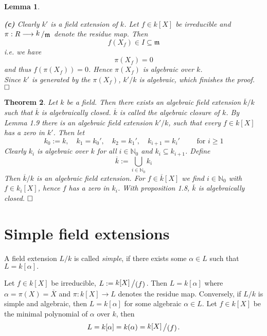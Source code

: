 \documentclass[11pt]{book}
\newtheorem{theorem}{Theorem}[section]
\newtheorem{lemma}[theorem]{Lemma}
\theoremstyle{nonumberbreak}
\newenvironment{defin}[1][]{\ifthenelse{\equal{#1}{}}{\definition}{\definition[#1]}\rm}{\enddefinition}
\newenvironment{pr}[1][]{\ifthenelse{\equal{#1}{}}{\proof}{\proof[#1]}\rm}{\endproof}
\newenvironment{ex}[1][]{\ifthenelse{\equal{#1}{}}{\example}{\example[#1]}\rm}{\endexample}
\newcommand{\slant}[2]{{\raisebox{.1em}{$#1$}\left/\raisebox{-.1em}{$#2$}\right.}}
\begin{document}
\begin{spacing}{1.3}
\begin{lemma}
\begin{pr}
\begin{compactenum}
\item[\textbf{(c)}] Clearly $k'$ is a field extension of $k$.
Let $f \in k[X]$ be irreducible and\\ $\pi: R \longrightarrow \slant{k}{\mathfrak{m}}$ denote the residue map. Then $$f(X_f) \in I \subseteq \mathfrak{m}$$i.e. we have $$\pi(X_f)=0$$ and thus $f\left(\pi(X_f)\right)=0$. Hence $\pi(X_f)$ is algebraic over $k$.\\
Since $k'$ is generated by the $\pi(X_f)$, $k'/k$ is algebraic, which finishes the proof. $\hfill \Box$
\end{compactenum}
\end{pr}
\end{lemma}

\begin{theorem} %
Let $k$ be a field. Then there exists an algebraic field extension $\overline{k}/k$ such that $\overline{k}$ is algebraically closed. $\overline{k}$ is called the \textit{algebraic closure} of $k$.
\begin{pr}
By Lemma 1.9 there is an algebraic field extension $k'/k$, such that every $f \in k[X]$ has a zero in $k'$.
Then let $$k_0:=k, \quad k_1=k_0', \quad k_2=k_1', \quad k_{i+1}=k_i' \qquad \textrm{ for } i \geqslant 1$$
Clearly $k_i$ is algebraic over $k$ for all $i \in \mathbb{N}_0$ and $k_i \subseteq k_{i+1}$.
Define $$\overline{k}:= \bigcup_{i \in \mathbb{N}_0} k_i$$Then $\overline{k}/k$ is an algebraic field extension. For $f \in \overline{k}[X]$ we find $i \in \mathbb{N}_0$ with $f \in k_i[X]$, hence $f$ has a zero in $k_i$. With proposition 1.8, $\overline{k}$ is algebraically closed. $\hfill \Box$
\end{pr}
\end{theorem}


\renewcommand*\thesection{§ \arabic{section}\quad}
\section{Simple field extensions}
\renewcommand*\thesection{\arabic{section}}

\begin{defin}  %
A field extension $L/k$ is called \textit{simple}, if there exists some $\alpha \in L$ such that $L=k[\alpha].$
\end{defin}

\begin{ex} %
Let $f \in k[X]$ be irreducible, $L:=\slant{k[X]}{( f)}$.
Then $L=k[\alpha]$ where $\alpha= \pi(X)=\overline{X}$ and $\pi: k[X] \longrightarrow L$ denotes the residue map.
Conversely, if $L/k$ is simple and algebraic, then $L=k[\alpha]$ for some algebraic $\alpha \in L$. Let $f \in  k[X]$ be the minimal polynomial of $\alpha$ over $k$, then $$L=k[\alpha]=k(\alpha)=\slant{k[X]}{( f )}.$$
\end{ex}


\end{spacing}
\end{document}
